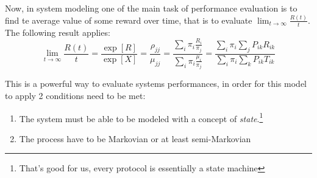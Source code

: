 Now, in system modeling one of the main task of performance evaluation is to find te average value of some reward over time, that is to evaluate $\lim_{t \to \infty}\frac{R(t)}{t}$. The following result applies:
\begin{equation}
\lim_{t \to \infty}\frac{R(t)}{t} = \frac{\exp[R]}{\exp[X]} = \frac{\rho_{jj}}{\mu_{jj}} = \frac{\sum_i \pi_i \frac{R_i}{\pi_j}}{\sum_i \pi_i \frac{\mu_i}{\pi_j}} = \frac{\sum_i \pi_i \sum_j P_{ik} R_{ik}}{\sum_i \pi_i \sum_k P_{ik}T_{ik}}
\end{equation}

This is a powerful way to evaluate systems performances, in order for this model to apply 2 conditions need to be met:
\begin{enumerate}
	\item The system must be able to be modeled with a concept of \emph{state}.\footnote{That's good for us, every protocol is essentially a state machine}
	\item The process have to be Markovian or at least semi-Markovian
\end{enumerate}
